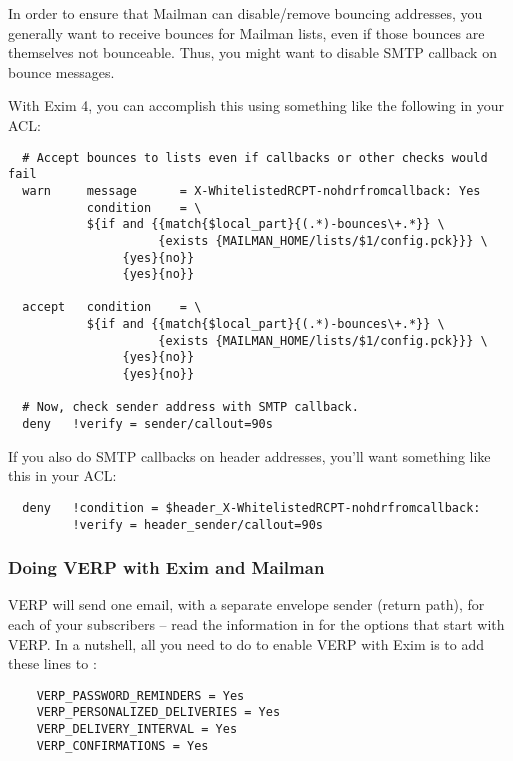 \documentclass{howto}
\begin{document}
In order to ensure that Mailman can disable/remove bouncing addresses, you
generally want to receive bounces for Mailman lists, even if those bounces are
themselves not bounceable.  Thus, you might want to disable SMTP callback on
bounce messages.

With Exim 4, you can accomplish this using something like the following in
your  ACL:

\begin{verbatim}
  # Accept bounces to lists even if callbacks or other checks would fail
  warn     message      = X-WhitelistedRCPT-nohdrfromcallback: Yes
           condition    = \
           ${if and {{match{$local_part}{(.*)-bounces\+.*}} \
                     {exists {MAILMAN_HOME/lists/$1/config.pck}}} \
                {yes}{no}}
                {yes}{no}}

  accept   condition    = \
           ${if and {{match{$local_part}{(.*)-bounces\+.*}} \
                     {exists {MAILMAN_HOME/lists/$1/config.pck}}} \
                {yes}{no}}
                {yes}{no}}

  # Now, check sender address with SMTP callback.
  deny   !verify = sender/callout=90s
\end{verbatim}

If you also do SMTP callbacks on header addresses, you'll want something like
this in your  ACL:

\begin{verbatim}
  deny   !condition = $header_X-WhitelistedRCPT-nohdrfromcallback:
         !verify = header_sender/callout=90s
\end{verbatim}

\subsubsection{Doing VERP with Exim and Mailman}

VERP will send one email, with a separate envelope sender (return path), for
each of your subscribers -- read the information in
 for the options that start with VERP.
In a nutshell, all you need to do to enable VERP with Exim is to add these lines to :

\begin{verbatim}
    VERP_PASSWORD_REMINDERS = Yes
    VERP_PERSONALIZED_DELIVERIES = Yes
    VERP_DELIVERY_INTERVAL = Yes
    VERP_CONFIRMATIONS = Yes
\end{verbatim}
\end{document}
